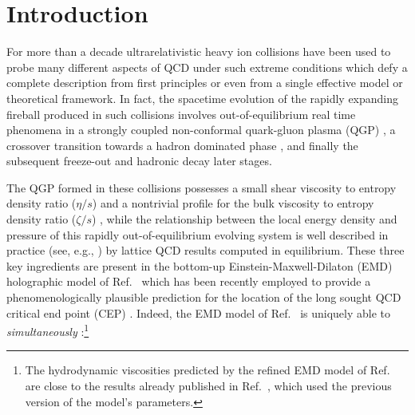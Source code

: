 \documentclass[aps,prd,showkeys,superscriptaddress,singlecolumn,nofootinbib,floatfix]{revtex4-1}
\begin{document}


\maketitle
\tableofcontents



\section{Introduction}
\label{sec:intro}

For more than a decade ultrarelativistic heavy ion collisions \cite{Arsene:2004fa,Adcox:2004mh,Back:2004je,Adams:2005dq,Aad:2013xma} have been used to probe many different aspects of QCD under such extreme conditions which defy a complete description from first principles or even from a single effective model or theoretical framework. In fact, the spacetime evolution of the rapidly expanding fireball produced in such collisions involves out-of-equilibrium real time phenomena in a strongly coupled non-conformal quark-gluon plasma (QGP) \cite{Gyulassy:2004zy,Heinz:2013th,Shuryak:2014zxa}, a crossover transition towards a hadron dominated phase \cite{Aoki:2006we,Borsanyi:2016ksw}, and finally the subsequent freeze-out and hadronic decay later stages.

The QGP formed in these collisions possesses a small shear viscosity to entropy density ratio ($\eta/s$) and a nontrivial profile for the bulk viscosity to entropy density ratio ($\zeta/s$) \cite{Schenke:2010rr,Song:2010mg,Gale:2012rq,Noronha-Hostler:2013gga,Noronha-Hostler:2014dqa,Ryu:2015vwa,Bernhard:2016tnd,Bernhard:2017vql,Bernhard:2018hnz,Ryu:2017qzn}, while the relationship between the local energy density and pressure of this rapidly out-of-equilibrium evolving system is well described in practice (see, e.g., \cite{Pratt:2015zsa,Monnai:2017cbv,Alba:2017hhe}) by lattice QCD results computed in equilibrium. These three key ingredients are present in the bottom-up Einstein-Maxwell-Dilaton (EMD) holographic model of Ref.\ \cite{Critelli:2017oub} which has been recently employed to provide a phenomenologically plausible prediction for the location of the long sought QCD critical end point (CEP) \cite{Stephanov:1998dy,Stephanov:1999zu,Rischke:2003mt,Stephanov:2011pb}. Indeed, the EMD model of Ref.\ \cite{Critelli:2017oub} is uniquely able to {\it simultaneously} \cite{Critelli:2017oub,Rougemont:2017tlu}:\footnote{The hydrodynamic viscosities predicted by the refined EMD model of Ref.\ \cite{Critelli:2017oub} are close to the results already published in Ref.\ \cite{Rougemont:2017tlu}, which used the previous version \cite{Rougemont:2015wca} of the model's parameters.}
\end{document}
